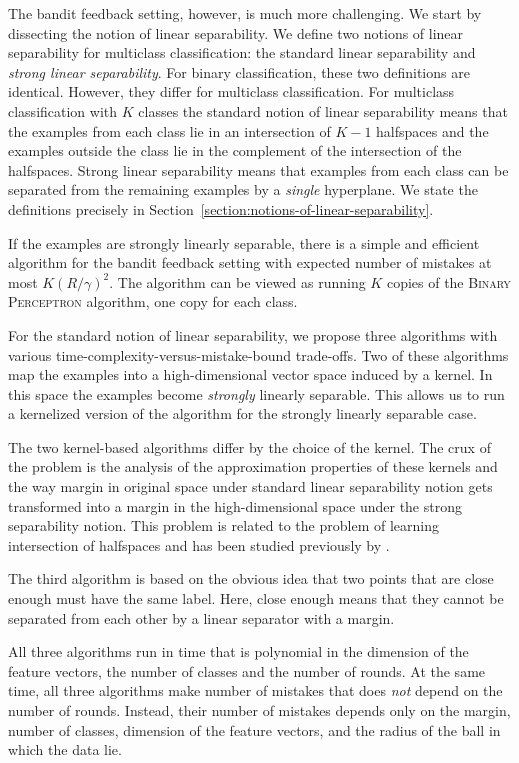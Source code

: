 \documentclass[12pt]{article}
\begin{document}
The bandit feedback setting, however, is much more challenging. We start by
dissecting the notion of linear separability. We define two notions of linear
separability for multiclass classification: the standard linear separability
and \emph{strong linear separability}. For binary classification, these two
definitions are identical. However, they differ for multiclass classification.
For multiclass classification with $K$ classes the standard notion of linear
separability means that the examples from each class lie in an intersection of
$K-1$ halfspaces and the examples outside the class lie in the complement of the
intersection of the halfspaces. Strong linear separability means that examples
from each class can be separated from the remaining examples by a \emph{single}
hyperplane. We state the definitions precisely
in Section~\ref{section:notions-of-linear-separability}.

If the examples are strongly linearly separable, there is a simple and efficient
algorithm for the bandit feedback setting with expected number of mistakes
at most $K (R/\gamma)^2$. The algorithm can be viewed as running $K$ copies of
the \textsc{Binary Perceptron} algorithm, one copy for each class.

For the standard notion of linear separability, we propose three algorithms with
various time-complexity-versus-mistake-bound trade-offs. Two of these algorithms
map the examples into a high-dimensional vector space induced by a kernel. In
this space the examples become \emph{strongly} linearly separable. This allows
us to run a kernelized version of the algorithm for the strongly linearly
separable case.

The two kernel-based algorithms differ by the choice of the kernel. The crux of
the problem is the analysis of the approximation properties of these kernels and
the way margin in original space under standard linear separability notion gets
transformed into a margin in the high-dimensional space under the strong
separability notion. This problem is related to the problem of learning
intersection of halfspaces and has been studied previously by
\cite{Klivans-Servedio-2008}.

The third algorithm is based on the obvious idea that two points that are close
enough must have the same label. Here, close enough means that they cannot be
separated from each other by a linear separator with a margin.

All three algorithms run in time that is polynomial in the dimension of the
feature vectors, the number of classes and the number of rounds. At the same
time, all three algorithms make number of mistakes that does \emph{not} depend
on the number of rounds. Instead, their number of mistakes depends only on the
margin, number of classes, dimension of the feature vectors, and the radius of
the ball in which the data lie.
\end{document}
